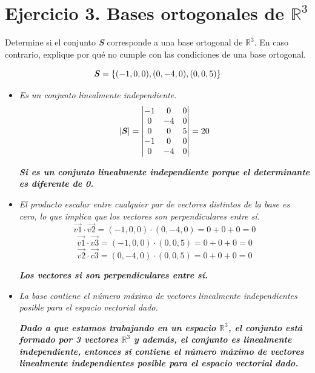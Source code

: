 
\FloatBarrier
\section{\large Ejercicio 3. Bases ortogonales de $\mathbb{R}^3$}

Determine si el conjunto \textbf{\textit{S}} corresponde a una base ortogonal de $\mathbb{R}^3$. En caso contrario, explique por qué no cumple con las condiciones de una base ortogonal.

\[
    \text{\textbf{\textit{S}}}=\left\{(-1,0,0),(0,-4,0),(0,0,5)\right\}
\]

\begin{itemize}
    \item \textit{Es un conjunto linealmente independiente.}
    \[
        \left|\text{\textbf{\textit{S}}}\right|=
        \begin{vmatrix}
            -1 & 0 & 0 \\
            0 & -4 & 0 \\
            0 & 0 & 5 \\
            -1 & 0 & 0 \\
            0 & -4 & 0 \\
        \end{vmatrix}
        =20
    \]
    \begin{center}
        \textbf{\textit{Si es un conjunto linealmente independiente porque el determinante es diferente de 0.}}
    \end{center}
    \item \textit{El producto escalar entre cualquier par de vectores distintos de la base es 
    cero, lo que implica que los vectores son perpendiculares entre sí.}
    \[
        \vec{v1}\cdot\vec{v2}=(-1,0,0)\cdot(0,-4,0)=0+0+0=0
    \]
    \[
        \vec{v1}\cdot\vec{v3}=(-1,0,0)\cdot(0,0,5)=0+0+0=0
    \]
    \[
        \vec{v2}\cdot\vec{c3}=(0,-4,0)\cdot(0,0,5)=0+0+0=0
    \]
    \begin{center}
        \textbf{\textit{Los vectores si son perpendiculares entre sí.}}
    \end{center}
    \item \textit{La base contiene el número máximo de vectores linealmente independientes 
    posible para el espacio vectorial dado.}
    \begin{center}
        \textbf{\textit{Dado a que estamos trabajando en un espacio $\mathbb{R}^3$, el conjunto está formado por 3 vectores $\mathbb{R}^3$ y además, el conjunto es linealmente independiente, entonces sí contiene el número máximo de vectores linealmente independientes posible para el espacio vectorial dado.}}
    \end{center}
\end{itemize}

